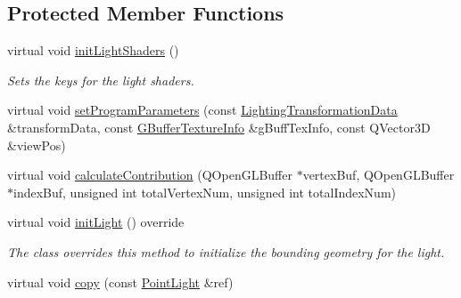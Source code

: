 \subsection*{Protected Member Functions}
\begin{DoxyCompactItemize}
\item 
\mbox{\label{class_geometry_engine_1_1_geometry_world_item_1_1_geometry_light_1_1_point_light_a753a40c1c3c3a9a550980c002c636cfa}} 
virtual void \mbox{\hyperlink{class_geometry_engine_1_1_geometry_world_item_1_1_geometry_light_1_1_point_light_a753a40c1c3c3a9a550980c002c636cfa}{init\+Light\+Shaders}} ()
\begin{DoxyCompactList}\small\item\em Sets the keys for the light shaders. \end{DoxyCompactList}\item 
virtual void \mbox{\hyperlink{class_geometry_engine_1_1_geometry_world_item_1_1_geometry_light_1_1_point_light_acf3ebd411b36d95ba26ae41bcc25793a}{set\+Program\+Parameters}} (const \mbox{\hyperlink{class_geometry_engine_1_1_lighting_transformation_data}{Lighting\+Transformation\+Data}} \&transform\+Data, const \mbox{\hyperlink{class_geometry_engine_1_1_g_buffer_texture_info}{G\+Buffer\+Texture\+Info}} \&g\+Buff\+Tex\+Info, const Q\+Vector3D \&view\+Pos)
\item 
virtual void \mbox{\hyperlink{class_geometry_engine_1_1_geometry_world_item_1_1_geometry_light_1_1_point_light_aa30244fd20e61fdfe1ac1d85c99fd154}{calculate\+Contribution}} (Q\+Open\+G\+L\+Buffer $\ast$vertex\+Buf, Q\+Open\+G\+L\+Buffer $\ast$index\+Buf, unsigned int total\+Vertex\+Num, unsigned int total\+Index\+Num)
\item 
\mbox{\label{class_geometry_engine_1_1_geometry_world_item_1_1_geometry_light_1_1_point_light_a0c6434862dabcbe1e32e04b8d73b5314}} 
virtual void \mbox{\hyperlink{class_geometry_engine_1_1_geometry_world_item_1_1_geometry_light_1_1_point_light_a0c6434862dabcbe1e32e04b8d73b5314}{init\+Light}} () override
\begin{DoxyCompactList}\small\item\em The class overrides this method to initialize the bounding geometry for the light. \end{DoxyCompactList}\item 
virtual void \mbox{\hyperlink{class_geometry_engine_1_1_geometry_world_item_1_1_geometry_light_1_1_point_light_ab0ed78036120211285fffdde1408352e}{copy}} (const \mbox{\hyperlink{class_geometry_engine_1_1_geometry_world_item_1_1_geometry_light_1_1_point_light}{Point\+Light}} \&ref)
\end{DoxyCompactItemize}
